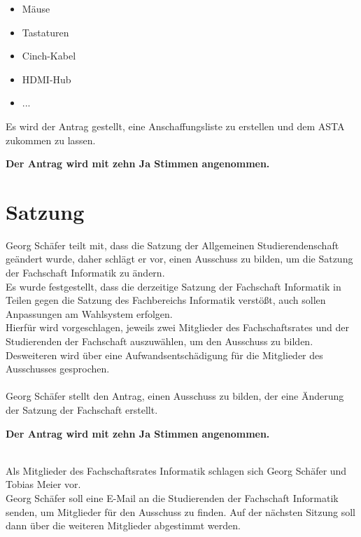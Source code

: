 \documentclass[a4paper, 11pt]{article} %
\begin{document}
\begin{itemize}\itemsep 0pt

	\item Mäuse
	\item Tastaturen
	\item Cinch-Kabel
	\item HDMI-Hub
	\item ... 
        
\end{itemize}

\begin{flushleft}
Es wird der Antrag gestellt, eine Anschaffungsliste zu erstellen und dem ASTA zukommen zu lassen.
\end{flushleft}

\begin{center}
	\textbf{Der Antrag wird mit zehn Ja Stimmen angenommen.}
\end{center}

\section{Satzung}

Georg Schäfer teilt mit, dass die Satzung der Allgemeinen Studierendenschaft geändert wurde, daher schlägt er vor, einen Ausschuss zu bilden, um die Satzung der Fachschaft Informatik zu ändern.
\\
 Es wurde festgestellt, dass die derzeitige Satzung der Fachschaft Informatik in Teilen gegen die Satzung des Fachbereichs Informatik verstößt, auch sollen Anpassungen am Wahlsystem erfolgen. 
\\
Hierfür wird vorgeschlagen, jeweils zwei Mitglieder des Fachschaftsrates und der Studierenden der Fachschaft auszuwählen, um den Ausschuss zu bilden. Desweiteren wird über eine Aufwandsentschädigung für die Mitglieder des Ausschusses gesprochen.
\\\\
Georg Schäfer stellt den Antrag, einen Ausschuss zu bilden, der eine Änderung der Satzung der Fachschaft erstellt. 

\begin{center}
	\textbf{Der Antrag wird mit zehn Ja Stimmen angenommen.}
\end{center}
\ \\
Als Mitglieder des Fachschaftsrates Informatik schlagen sich Georg Schäfer und Tobias Meier vor.\\
Georg Schäfer soll eine E-Mail an die Studierenden der Fachschaft Informatik senden, um Mitglieder für den Ausschuss zu finden. Auf der nächsten Sitzung soll dann über die weiteren Mitglieder abgestimmt werden.
\end{document}
